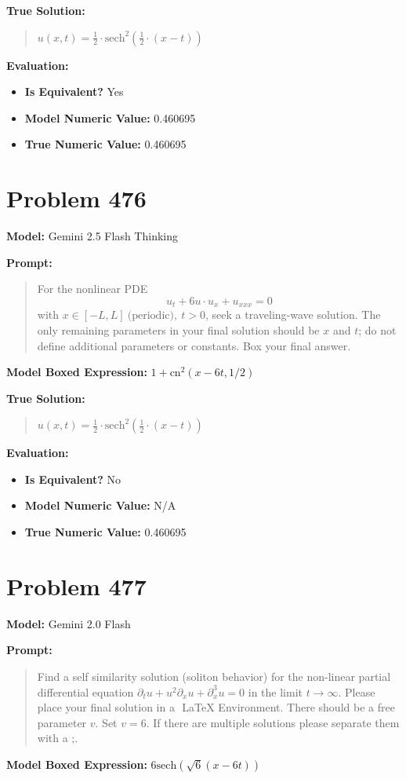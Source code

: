\documentclass{article}
\begin{document}
\textbf{True Solution:}
\begin{quote}
$u(x,t) = \frac{1}{2}\cdot\text{sech}^2\left(\frac{1}{2}\cdot(x - t)\right)$
\end{quote}

\textbf{Evaluation:}
\begin{itemize}
\item \textbf{Is Equivalent?} Yes
\item \textbf{Model Numeric Value:} 0.460695
\item \textbf{True Numeric Value:} 0.460695
\end{itemize}
\vspace{1cm}
\section*{Problem 476}
\textbf{Model:} Gemini 2.5 Flash Thinking

\textbf{Prompt:}
\begin{quote}
For the nonlinear PDE $$u_t + 6u\cdot u_x + u_{xxx} = 0$$ with $x\in [-L,L] \ \text{(periodic)}, \ t>0$, seek a traveling‐wave solution. The only remaining parameters in your final solution should be $x$ and $t$; do not define additional parameters or constants. Box your final answer.
\end{quote}
\textbf{Model Boxed Expression:} $1+\text{cn}^2(x-6t, 1/2)$

\textbf{True Solution:}
\begin{quote}
$u(x,t) = \frac{1}{2}\cdot\text{sech}^2\left(\frac{1}{2}\cdot(x - t)\right)$
\end{quote}

\textbf{Evaluation:}
\begin{itemize}
\item \textbf{Is Equivalent?} No
\item \textbf{Model Numeric Value:} N/A
\item \textbf{True Numeric Value:} 0.460695
\end{itemize}
\vspace{1cm}
\section*{Problem 477}
\textbf{Model:} Gemini 2.0 Flash

\textbf{Prompt:}
\begin{quote}
Find a self similarity solution (soliton behavior) for the non-linear partial differential equation $ \partial_t u + u^2 \partial_x u + \partial_x^3 u = 0 $ in the limit $t\to\infty$. Please place your final solution in a $\boxed{}$ LaTeX Environment. There should be a free parameter $v$. Set $v=6$. If there are multiple solutions please separate them with a ;.
\end{quote}
\textbf{Model Boxed Expression:} $6 \text{sech}(\sqrt{6}(x-6t))$
\end{document}
